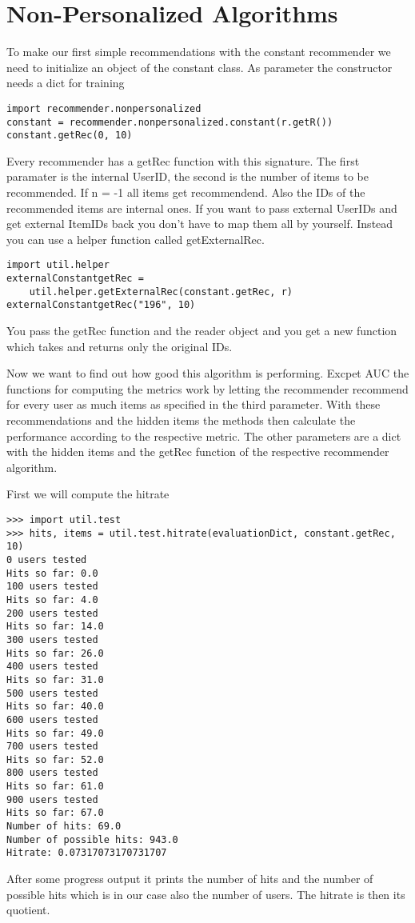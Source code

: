 \section{Non-Personalized Algorithms}
To make our first simple recommendations with the constant recommender
we need to initialize an object of the constant class.
As parameter the constructor needs a dict for training
\begin{lstlisting}
import recommender.nonpersonalized
constant = recommender.nonpersonalized.constant(r.getR())
constant.getRec(0, 10)
\end{lstlisting}
Every recommender has a getRec function with this signature. The first paramater is the internal
UserID, the second is the number of items to be recommended. If n = -1 all items get recommendend.
Also the IDs of the recommended items are internal ones.
If you want to pass external UserIDs and get external ItemIDs back you don't have
to map them all by yourself. Instead you can use a helper function called
getExternalRec.
\begin{lstlisting}
import util.helper
externalConstantgetRec = 
    util.helper.getExternalRec(constant.getRec, r)
externalConstantgetRec("196", 10)
\end{lstlisting}
You pass the getRec function and the reader object and you get a new function
which takes and returns only the original IDs.

Now we want to find out how good this algorithm is performing.
Excpet AUC the functions for computing the metrics work by letting the recommender recommend
for every user as much items as specified in the third parameter.
With these recommendations and the hidden items the methods then calculate the
performance according to the respective metric.
The other parameters are a dict with the hidden items and the getRec function of the 
respective recommender algorithm.

First we will compute the hitrate
\begin{lstlisting}
>>> import util.test
>>> hits, items = util.test.hitrate(evaluationDict, constant.getRec, 10)
0 users tested
Hits so far: 0.0
100 users tested
Hits so far: 4.0
200 users tested
Hits so far: 14.0
300 users tested
Hits so far: 26.0
400 users tested
Hits so far: 31.0
500 users tested
Hits so far: 40.0
600 users tested
Hits so far: 49.0
700 users tested
Hits so far: 52.0
800 users tested
Hits so far: 61.0
900 users tested
Hits so far: 67.0
Number of hits: 69.0
Number of possible hits: 943.0
Hitrate: 0.07317073170731707
\end{lstlisting}
After some progress output it prints the number of hits and the number of 
possible hits which is in our case also the number of users. The hitrate
is then its quotient.


